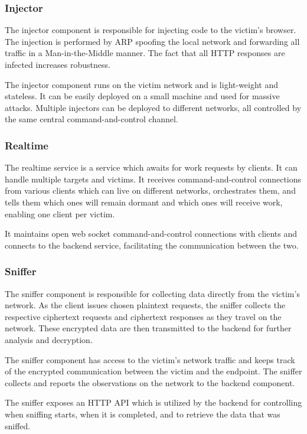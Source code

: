 \documentclass[conference, letterpaper, 10pt]{IEEEtran}
\begin{document}
\subsubsection{Injector}

The injector component is responsible for injecting code to the victim's
browser. The injection is performed by ARP spoofing the local
network and forwarding all traffic in a Man-in-the-Middle manner. The fact that all HTTP
responses are infected increases robustness.

The injector component runs on the victim network and is
light-weight and stateless. It can be easily deployed on a small machine and
used for massive attacks. Multiple injectors can be deployed to different
networks, all controlled by the same central command-and-control channel.

\subsubsection{Realtime}

The realtime service is a service which awaits for work requests by clients. It
can handle multiple targets and victims. It receives command-and-control
connections from various clients which can live on different networks,
orchestrates them, and tells them which ones will remain dormant and which ones
will receive work, enabling one client per victim.

It maintains open web socket command-and-control connections with clients and
connects to the backend service, facilitating the communication between the two.

\subsubsection{Sniffer}

The sniffer component is responsible for collecting data directly from the
victim's network. As the client issues chosen plaintext requests, the sniffer
collects the respective ciphertext requests and ciphertext responses as they
travel on the network. These encrypted data are then transmitted to the backend
for further analysis and decryption.

The sniffer component has access to the victim's network traffic and keeps track
of the encrypted communication between the victim and the endpoint. The sniffer
collects and reports the observations on the network to the backend component.

The sniffer exposes an HTTP API which is utilized by the backend for controlling
when sniffing starts, when it is completed, and to retrieve the data that was
sniffed.
\end{document}
